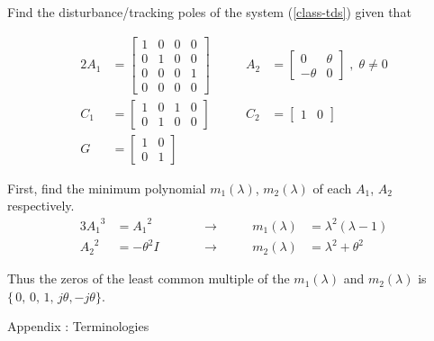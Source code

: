 \documentclass[a4paper]{article}
\theoremstyle{plain} %
{\theorembodyfont{\normalfont}
\newtheorem{Exa}{Example}}
\def\mp{minimum polynomial }
\def\dt{disturbance/tracking }
\begin{document}
\begin{Exa} Find the \dt poles of the system (\ref{class-tds})
given that

\begin{alignat}{2}
A_1 &= \left[ \begin{array}{cccc}
         1 & 0 & 0 & 0 \\
         0 & 1 & 0 & 0 \\
         0 & 0 & 0 & 1 \\
         0 & 0 & 0 & 0
      \end{array} \right]      &\qquad %
A_2 &= \left[ \begin{array}{rr}
         0 & \theta \\
         -\theta & 0
      \end{array} \right] \; , \; \theta \neq 0      \nonumber \\%
C_1 &= \left[ \begin{array}{cccc}
         1 & 0 & 1 & 0 \\
         0 & 1 & 0 & 0
       \end{array} \right]   &\qquad
C_2 &= \left[ \begin{array}{cc}
                1 & 0
       \end{array} \right]     \nonumber \\%
G &= \left[ \begin{array}{cc}
          1 & 0 \\
          0 & 1
     \end{array} \right] \nonumber
\end{alignat}

First, find the \mp $m_1(\lambda)$, $m_2(\lambda)$ of each $A_1$,
$A_2$ respectively.
\begin{alignat}{3}
{A_1}^3 &= {A_1}^2 &\qquad  &\rightarrow &\qquad m_1(\lambda) &= {\lambda}^2 (\lambda - 1) \nonumber \\%
{A_2}^2 &= -{\theta}^2 I &\qquad &\rightarrow  &\qquad
m_2(\lambda) &= {\lambda}^2+{\theta}^2 \nonumber
\end{alignat}

Thus the zeros of the least common multiple of the $m_1(\lambda)$
and $m_2(\lambda)$ is $\{\,0,\,0,\,1,\,j \theta, -j \theta \}$.

\end{Exa}

\vspace{\baselineskip}
\begin{center}
\sc \Large Appendix : Terminologies
\end{center}
\end{document}
